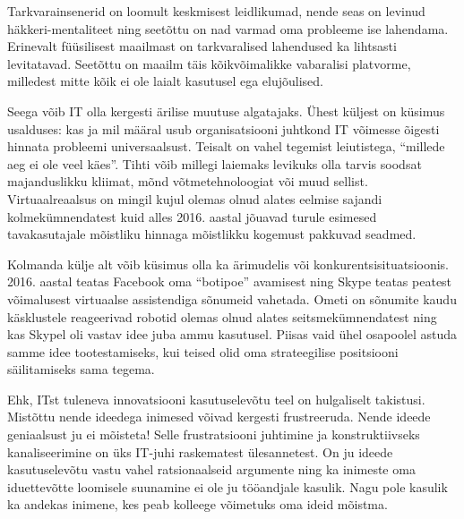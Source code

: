 \documentclass{tufte-book}
\begin{document}
Tarkvarainsenerid on loomult keskmisest leidlikumad, nende seas on levinud häkkeri-mentaliteet ning seetõttu on nad varmad oma probleeme ise lahendama. Erinevalt füüsilisest maailmast on tarkvaralised lahendused ka lihtsasti levitatavad. Seetõttu on maailm täis kõikvõimalikke vabaralisi platvorme, milledest mitte kõik ei ole laialt kasutusel ega elujõulised. 

Seega võib IT olla kergesti ärilise muutuse algatajaks. Ühest küljest on küsimus usalduses: kas ja mil määral usub organisatsiooni juhtkond IT võimesse õigesti hinnata probleemi universaalsust. Teisalt on vahel tegemist leiutistega, \enquote{millede aeg ei ole veel käes}. Tihti võib millegi laiemaks levikuks olla tarvis soodsat majanduslikku kliimat, mõnd võtmetehnoloogiat või muud sellist. Virtuaalreaalsus on mingil kujul olemas olnud alates eelmise sajandi kolmekümnendatest kuid alles 2016. aastal jõuavad turule esimesed tavakasutajale mõistliku hinnaga mõistlikku kogemust pakkuvad seadmed. 

Kolmanda külje alt võib küsimus olla ka ärimudelis või konkurentsisituatsioonis. 2016. aastal teatas Facebook oma \enquote{botipoe} avamisest ning Skype teatas peatest võimalusest virtuaalse assistendiga sõnumeid vahetada. Ometi on sõnumite kaudu käsklustele reageerivad robotid olemas olnud alates seitsmekümnendatest ning kas Skypel oli vastav idee juba ammu kasutusel. Piisas vaid ühel osapoolel astuda samme idee tootestamiseks, kui teised olid oma strateegilise positsiooni säilitamiseks sama tegema.

Ehk, ITst tuleneva innovatsiooni kasutuselevõtu teel on hulgaliselt takistusi. Mistõttu nende ideedega inimesed võivad kergesti frustreeruda. Nende ideede geniaalsust ju ei mõisteta! Selle frustratsiooni juhtimine ja konstruktiivseks kanaliseerimine on üks IT-juhi raskematest ülesannetest. On ju ideede kasutuselevõtu vastu vahel ratsionaalseid argumente ning ka inimeste oma iduettevõtte loomisele suunamine ei ole ju tööandjale kasulik. Nagu pole kasulik ka andekas inimene, kes peab kolleege võimetuks oma ideid mõistma. 
\end{document}
